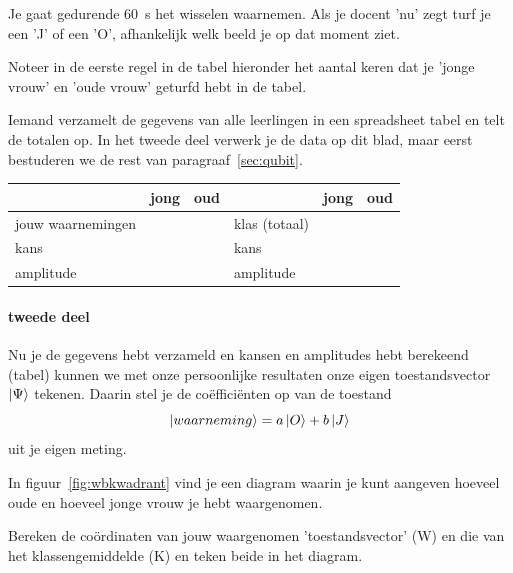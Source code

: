 \documentclass[../../main.tex]{subfiles}
\begin{document}
Je gaat gedurende \SI{60}{\second} het wisselen waarnemen. Als je docent 'nu' zegt turf je een 'J' of een 'O', afhankelijk welk beeld je op dat moment ziet. 

Noteer in de eerste regel in de tabel hieronder het aantal keren dat je 'jonge vrouw' en 'oude vrouw' geturfd hebt  in de tabel.

Iemand verzamelt de gegevens van alle leerlingen in een spreadsheet tabel en telt de totalen op. In het tweede deel verwerk je de data op dit blad, maar eerst bestuderen we de rest van paragraaf~\ref{sec:qubit}.

\begin{tabular}{l|l|l||l|l|l}
                & jong & oud &                 & jong & oud \\ \hline
jouw waarnemingen &      &     & klas (totaal)            &      &     \\ \hline
kans            &      &     & kans            &      &     \\ \hline
amplitude   &      &     & amplitude &      &    
\end{tabular}

\vspace{.5cm}

\paragraph{tweede deel} Nu je de gegevens hebt verzameld en kansen en amplitudes hebt berekeend (tabel) kunnen we met onze persoonlijke resultaten onze eigen toestandsvector $\ket{\Psi}$ tekenen. 
 Daarin stel je de co\"effici\"enten op van de toestand \[\ket{waarneming}=a\ket{O}+b\ket{J}\] uit je eigen meting.

In figuur~\ref{fig:wbkwadrant} vind je een diagram waarin je kunt aangeven hoeveel oude en hoeveel jonge vrouw je hebt waargenomen.

Bereken de co\"ordinaten van jouw  waargenomen 'toestandsvector' (W) en die van het klassengemiddelde (K) en teken beide in het diagram. 
\end{document}
